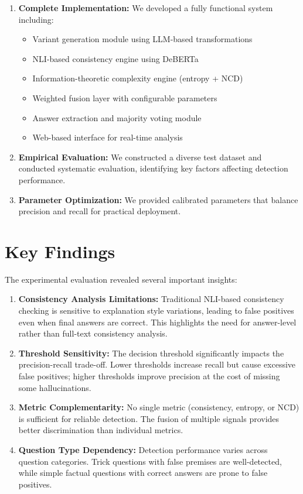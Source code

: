 \begin{enumerate}
    \item \textbf{Complete Implementation:} We developed a fully functional system including:
    \begin{itemize}
        \item Variant generation module using LLM-based transformations
        \item NLI-based consistency engine using DeBERTa
        \item Information-theoretic complexity engine (entropy + NCD)
        \item Weighted fusion layer with configurable parameters
        \item Answer extraction and majority voting module
        \item Web-based interface for real-time analysis
    \end{itemize}

    \item \textbf{Empirical Evaluation:} We constructed a diverse test dataset and conducted systematic evaluation, identifying key factors affecting detection performance.

    \item \textbf{Parameter Optimization:} We provided calibrated parameters that balance precision and recall for practical deployment.
\end{enumerate}

\section{Key Findings}

The experimental evaluation revealed several important insights:

\begin{enumerate}
    \item \textbf{Consistency Analysis Limitations:} Traditional NLI-based consistency checking is sensitive to explanation style variations, leading to false positives even when final answers are correct. This highlights the need for answer-level rather than full-text consistency analysis.

    \item \textbf{Threshold Sensitivity:} The decision threshold significantly impacts the precision-recall trade-off. Lower thresholds increase recall but cause excessive false positives; higher thresholds improve precision at the cost of missing some hallucinations.

    \item \textbf{Metric Complementarity:} No single metric (consistency, entropy, or NCD) is sufficient for reliable detection. The fusion of multiple signals provides better discrimination than individual metrics.

    \item \textbf{Question Type Dependency:} Detection performance varies across question categories. Trick questions with false premises are well-detected, while simple factual questions with correct answers are prone to false positives.
\end{enumerate}

